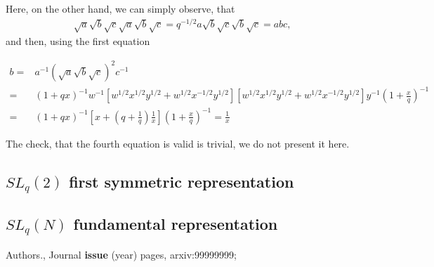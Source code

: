 \documentclass{article}
\newcommand{\lb}{\left (}
\newcommand{\rb}{\right )}
\newcommand{\lsb}{\left [}
\newcommand{\rsb}{\right ]}
\newcommand{\be}{\begin{eqnarray}}
\newcommand{\ee}{\end{eqnarray}}
\newcommand {\?}{\textit{???}}
\begin{document}
Here, on the other hand, we can simply observe, that
\be
\sqrt{a} \sqrt{b} \sqrt{c} \sqrt{a} \sqrt{b} \sqrt{c} = q^{-1/2} a \sqrt{b} \sqrt{c} \sqrt{b} \sqrt{c} = abc,
\ee
and then, using the first equation

\be
b = & a^{-1} \lb \sqrt{a}\sqrt{b}\sqrt{c} \rb^2 c^{-1} & \nonumber \\
= & \lb 1 + qx\rb^{-1}w^{-1}\lsb w^{1/2}x^{1/2}y^{1/2} + w^{1/2}x^{-1/2}y^{1/2} \rsb
\lsb w^{1/2}x^{1/2}y^{1/2} + w^{1/2}x^{-1/2}y^{1/2} \rsb y^{-1}\lb 1 + \frac{x}{q}\rb^{-1}
\\ = & \lb 1 + qx\rb^{-1} \lsb x + \lb q + \frac{1}{q} \rb \frac{1}{x} \rsb \lb 1 + \frac{x}{q}\rb^{-1} = \frac{1}{x}
\nonumber 
\ee

The check, that the fourth equation is valid is trivial, we do not present it here.

\subsection{$SL_q(2)$ first symmetric representation}
\subsection{$SL_q(N)$ fundamental representation}

\begin{thebibliography}{12}

 Authors., Journal {\bf issue} (year) pages, arxiv:99999999;

\end{thebibliography}
\end{document}
